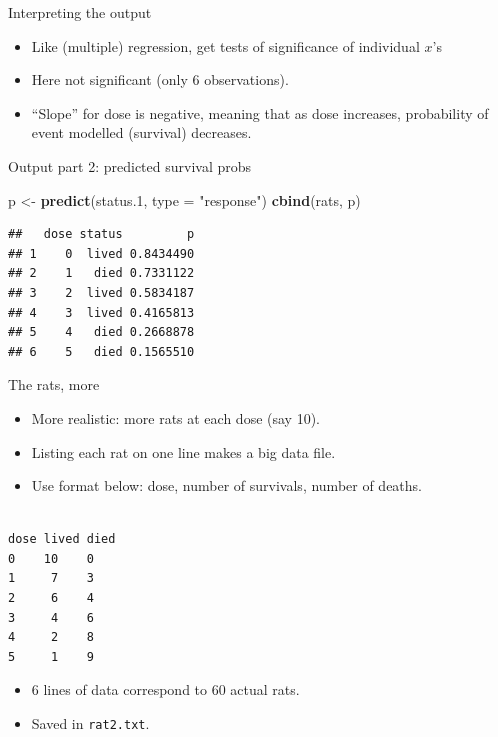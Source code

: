 \documentclass[ignorenonframetext,]{beamer}
\newenvironment{Shaded}{\begin{snugshade}}{\end{snugshade}}
\newcommand{\DataTypeTok}[1]{\textcolor[rgb]{0.13,0.29,0.53}{#1}}
\newcommand{\FloatTok}[1]{\textcolor[rgb]{0.00,0.00,0.81}{#1}}
\newcommand{\KeywordTok}[1]{\textcolor[rgb]{0.13,0.29,0.53}{\textbf{#1}}}
\newcommand{\NormalTok}[1]{#1}
\newcommand{\StringTok}[1]{\textcolor[rgb]{0.31,0.60,0.02}{#1}}
\begin{document}
\begin{frame}{Interpreting the output}
\protect\hypertarget{interpreting-the-output}{}

\begin{itemize}
\item
  Like (multiple) regression, get tests of significance of individual
  \(x\)'s
\item
  Here not significant (only 6 observations).
\item
  ``Slope'' for dose is negative, meaning that as dose increases,
  probability of event modelled (survival) decreases.
\end{itemize}

\end{frame}

\begin{frame}[fragile]{Output part 2: predicted survival probs}
\protect\hypertarget{output-part-2-predicted-survival-probs}{}

\begin{Shaded}
\begin{Highlighting}[]
\NormalTok{p <-}\StringTok{ }\KeywordTok{predict}\NormalTok{(status}\FloatTok{.1}\NormalTok{, }\DataTypeTok{type =} \StringTok{"response"}\NormalTok{)}
\KeywordTok{cbind}\NormalTok{(rats, p)}
\end{Highlighting}
\end{Shaded}

\begin{verbatim}
##   dose status         p
## 1    0  lived 0.8434490
## 2    1   died 0.7331122
## 3    2  lived 0.5834187
## 4    3  lived 0.4165813
## 5    4   died 0.2668878
## 6    5   died 0.1565510
\end{verbatim}

\end{frame}

\begin{frame}[fragile]{The rats, more}
\protect\hypertarget{the-rats-more}{}

\begin{itemize}
\item
  More realistic: more rats at each dose (say 10).
\item
  Listing each rat on one line makes a big data file.
\item
  Use format below: dose, number of survivals, number of deaths.
\end{itemize}

\begin{verbatim}

dose lived died
0    10    0
1     7    3 
2     6    4 
3     4    6 
4     2    8 
5     1    9  
\end{verbatim}

\begin{itemize}
\item
  6 lines of data correspond to 60 actual rats.
\item
  Saved in \texttt{rat2.txt}.
\end{itemize}

\end{frame}
\end{document}
